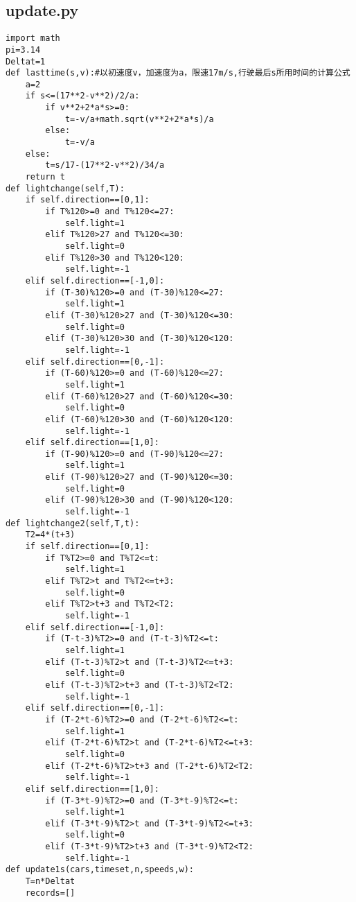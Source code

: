 \documentclass[a4paper,12pt]{article}
\numberwithin{equation}{section}
\begin{document}
\begin{appendix}
	\subsection{update.py}
	\begin{lstlisting}
import math
pi=3.14
Deltat=1
def lasttime(s,v):#以初速度v，加速度为a，限速17m/s,行驶最后s所用时间的计算公式 
    a=2
    if s<=(17**2-v**2)/2/a:
        if v**2+2*a*s>=0:
            t=-v/a+math.sqrt(v**2+2*a*s)/a
        else:
            t=-v/a
    else:
        t=s/17-(17**2-v**2)/34/a
    return t
def lightchange(self,T):
    if self.direction==[0,1]:
        if T%120>=0 and T%120<=27:
            self.light=1
        elif T%120>27 and T%120<=30:
            self.light=0
        elif T%120>30 and T%120<120:
            self.light=-1
    elif self.direction==[-1,0]:
        if (T-30)%120>=0 and (T-30)%120<=27:
            self.light=1
        elif (T-30)%120>27 and (T-30)%120<=30:
            self.light=0
        elif (T-30)%120>30 and (T-30)%120<120:
            self.light=-1
    elif self.direction==[0,-1]:
        if (T-60)%120>=0 and (T-60)%120<=27:
            self.light=1
        elif (T-60)%120>27 and (T-60)%120<=30:
            self.light=0
        elif (T-60)%120>30 and (T-60)%120<120:
            self.light=-1
    elif self.direction==[1,0]:
        if (T-90)%120>=0 and (T-90)%120<=27:
            self.light=1
        elif (T-90)%120>27 and (T-90)%120<=30:
            self.light=0
        elif (T-90)%120>30 and (T-90)%120<120:
            self.light=-1
def lightchange2(self,T,t):
    T2=4*(t+3)
    if self.direction==[0,1]:
        if T%T2>=0 and T%T2<=t:
            self.light=1
        elif T%T2>t and T%T2<=t+3:
            self.light=0
        elif T%T2>t+3 and T%T2<T2:
            self.light=-1
    elif self.direction==[-1,0]:
        if (T-t-3)%T2>=0 and (T-t-3)%T2<=t:
            self.light=1
        elif (T-t-3)%T2>t and (T-t-3)%T2<=t+3:
            self.light=0
        elif (T-t-3)%T2>t+3 and (T-t-3)%T2<T2:
            self.light=-1
    elif self.direction==[0,-1]:
        if (T-2*t-6)%T2>=0 and (T-2*t-6)%T2<=t:
            self.light=1
        elif (T-2*t-6)%T2>t and (T-2*t-6)%T2<=t+3:
            self.light=0
        elif (T-2*t-6)%T2>t+3 and (T-2*t-6)%T2<T2:
            self.light=-1
    elif self.direction==[1,0]:
        if (T-3*t-9)%T2>=0 and (T-3*t-9)%T2<=t:
            self.light=1
        elif (T-3*t-9)%T2>t and (T-3*t-9)%T2<=t+3:
            self.light=0
        elif (T-3*t-9)%T2>t+3 and (T-3*t-9)%T2<T2:
            self.light=-1
def update1s(cars,timeset,n,speeds,w):
    T=n*Deltat
    records=[]

\end{lstlisting}
\end{appendix}
\end{document}
